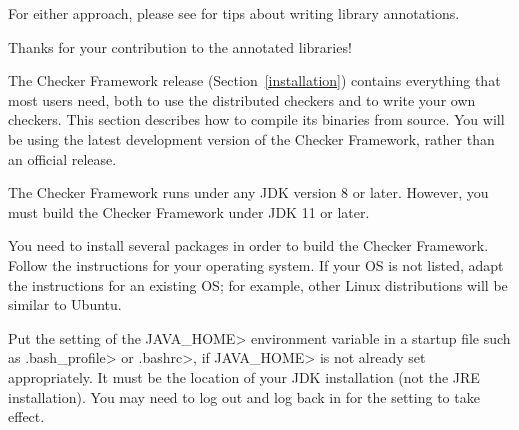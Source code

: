 For either approach, please see  for
tips about writing library annotations.

Thanks for your contribution to the annotated libraries!



The Checker Framework release (Section~\ref{installation}) contains
everything that most users need, both to use the distributed checkers and
to write your own checkers.  This section describes how to compile its
binaries from source.  You will be using the latest development version of
the Checker Framework, rather than an official release.


The Checker Framework runs under any JDK version 8 or later.
However, you must build the Checker Framework under JDK 11 or later.



You need to install several packages in order to build the Checker
Framework.
Follow the instructions for your operating system.
If your OS is not listed, adapt the instructions for an existing OS;
for example, other Linux distributions will be similar to Ubuntu.

Put the setting of the \<JAVA\_HOME> environment variable in a startup file
such as \<.bash\_profile> or \<.bashrc>, if \<JAVA\_HOME> is not already
set appropriately.  It must be the location of your JDK
installation (not the JRE installation).
You may need to log out and log back in for the setting to take effect.

